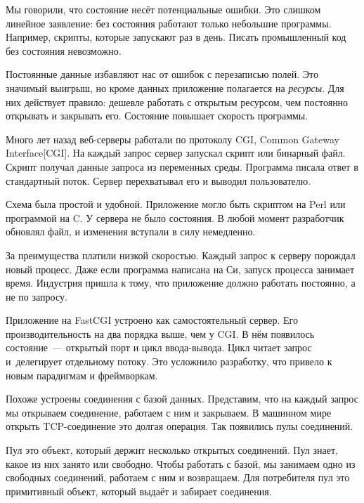 Мы говорили, что состояние несёт потенциальные ошибки. Это слишком линейное
заявление: без состояния работают только небольшие программы. Например, скрипты,
которые запускают раз в день. Писать промышленный код без состояния невозможно.


Постоянные данные избавляют нас от ошибок с перезаписью полей. Это значимый
выигрыш, но кроме данных приложение полагается на \emph{ресурсы}. Для них
действует правило: дешевле работать с открытым ресурсом, чем постоянно открывать
и закрывать его. Состояние повышает скорость программы.


Много лет назад веб-серверы работали по протоколу CGI, Common Gateway
Interface[CGI]. На
каждый запрос сервер запускал скрипт или бинарный файл. Скрипт получал данные
запроса из переменных среды. Программа писала ответ в стандартный поток. Сервер
перехватывал его и выводил пользователю.

Схема была простой и удобной. Приложение могло быть скриптом на Perl или
программой на C\Plus\Plus. У сервера не было состояния. В любой момент
разработчик обновлял файл, и изменения вступали в силу немедленно.

За преимущества платили низкой скоростью. Каждый запрос к серверу порождал новый
процесс. Даже если программа написана на Си, запуск процесса занимает
время. Индустрия пришла к тому, что приложение должно работать постоянно, а не
по запросу.


Приложение на FastCGI устроено как самостоятельный сервер. Его
производительность на два порядка выше, чем у CGI. В нём появилось
состояние~--- открытый порт и цикл ввода-вывода. Цикл читает запрос и~делегирует
отдельному потоку. Это усложнило разработку, что привело к новым парадигмам
и фреймворкам.

Похоже устроены соединения с базой данных. Представим, что на каждый запрос мы
открываем соединение, работаем с ним и закрываем. В машинном мире открыть
TCP-соединение это долгая операция. Так появились пулы соединений.


Пул это объект, который держит несколько открытых соединений. Пул знает, какое
из них занято или свободно. Чтобы работать с базой, мы занимаем одно из
свободных соединений, работаем с ним и возвращаем. Для потребителя пул это
примитивный объект, который выдаёт и забирает соединения.

